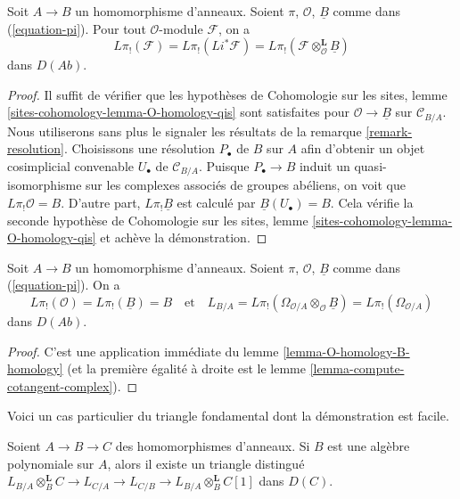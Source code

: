 \begin{lemma}
\label{lemma-O-homology-B-homology}
Soit $A \to B$ un homomorphisme d'anneaux. Soient $\pi$, $\mathcal{O}$,
$\underline{B}$ comme dans (\ref{equation-pi}). Pour tout $\mathcal{O}$-module
$\mathcal{F}$, on a
$$
L\pi_!(\mathcal{F}) = L\pi_!(Li^*\mathcal{F}) =
L\pi_!(\mathcal{F} \otimes_\mathcal{O}^\mathbf{L} \underline{B})
$$
dans $D(\textit{Ab})$.
\end{lemma}

\begin{proof}
Il suffit de vérifier que les hypothèses de Cohomologie sur les sites, lemme
\ref{sites-cohomology-lemma-O-homology-qis}
sont satisfaites pour $\mathcal{O} \to \underline{B}$ sur
$\mathcal{C}_{B/A}$. Nous utiliserons sans plus le signaler les résultats de
la remarque \ref{remark-resolution}. Choisissons une résolution $P_\bullet$
de $B$ sur $A$ afin d'obtenir un objet cosimplicial convenable $U_\bullet$ de
$\mathcal{C}_{B/A}$. Puisque $P_\bullet \to B$ induit un quasi-isomorphisme
sur les complexes associés de groupes abéliens, on voit que
$L\pi_!\mathcal{O} = B$. D'autre part, $L\pi_!\underline{B}$ est calculé par
$\underline{B}(U_\bullet) = B$. Cela vérifie la seconde hypothèse de
Cohomologie sur les sites, lemme
\ref{sites-cohomology-lemma-O-homology-qis}
et achève la démonstration.
\end{proof}

\begin{lemma}
\label{lemma-apply-O-B-comparison}
Soit $A \to B$ un homomorphisme d'anneaux. Soient $\pi$, $\mathcal{O}$,
$\underline{B}$ comme dans (\ref{equation-pi}). On a
$$
L\pi_!(\mathcal{O}) = L\pi_!(\underline{B}) = B
\quad\text{et}\quad
L_{B/A} = L\pi_!(\Omega_{\mathcal{O}/A} \otimes_\mathcal{O} \underline{B}) =
L\pi_!(\Omega_{\mathcal{O}/A})
$$
dans $D(\textit{Ab})$.
\end{lemma}

\begin{proof}
C'est une application immédiate du lemme
\ref{lemma-O-homology-B-homology} (et la première égalité à droite est le
lemme \ref{lemma-compute-cotangent-complex}).
\end{proof}

\noindent
Voici un cas particulier du triangle fondamental dont la démonstration est
facile.

\begin{lemma}
\label{lemma-special-case-triangle}
Soient $A \to B \to C$ des homomorphismes d'anneaux. Si $B$ est une algèbre
polynomiale sur $A$, alors il existe un triangle distingué 
$L_{B/A} \otimes_B^\mathbf{L} C \to L_{C/A} \to L_{C/B} \to
L_{B/A} \otimes_B^\mathbf{L} C[1]$ dans $D(C)$.
\end{lemma}

